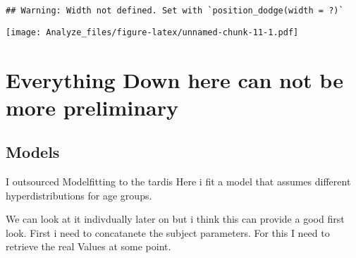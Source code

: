 \documentclass[]{article}
\begin{document}
\begin{verbatim}
## Warning: Width not defined. Set with `position_dodge(width = ?)`
\end{verbatim}

\texttt{[image: Analyze\_files/figure-latex/unnamed-chunk-11-1.pdf]}

\section{Everything Down here can not be more
preliminary}\label{everything-down-here-can-not-be-more-preliminary}

\subsection{Models}\label{models}

I outsourced Modelfitting to the tardis Here i fit a model that assumes
different hyperdistributions for age groups.

We can look at it indivdually later on but i think this can provide a
good first look. First i need to concatanete the subject parameters. For
this I need to retrieve the real Values at some point.
\end{document}
